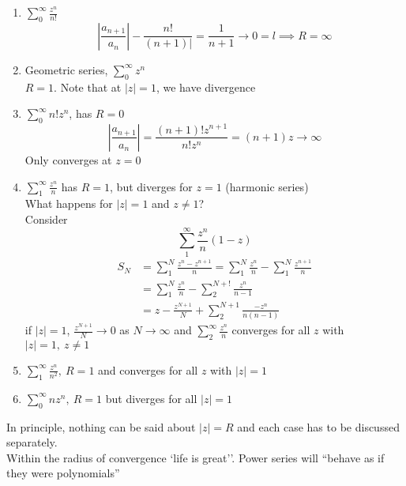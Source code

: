 \begin{example}
\hfill{ }
\begin{enumerate}
    \item $\sum_0^\infty \frac{z^n}{n!}$
    \[\left| \frac{a_{n+1}}{a_n}\right| - \frac{n!}{(n+1)|} = \frac{1}{n+1}\to 0 = l\implies R = \infty\]
    \item Geometric series, $\sum_0^\infty z^n$\\
    $R = 1$. Note that at $|z|=1$, we have divergence\\
    \item $\sum_0^\infty n!z^n$, has $R = 0$
    \[\left|\frac{a_{n+1}}{a_n}\right| = \frac{(n+1)!z^{n+1}}{n!z^n} = (n+1)z \to \infty\]
    Only converges at $z=0$
    \item $\sum_1^\infty \frac{z^n}{n}$ has $R =1$, but diverges for $z=1$ (harmonic series)\\
    What happens for $|z| = 1$ and $z\neq 1$?\\
    Consider
    \[\sum_1^\infty\frac{z^n}{n}(1-z)\]
    \begin{align*}
        S_N &= \sum_1^N\frac{z^n - z^{n+1}}{n} = \sum_1^N \frac{z^n}{n} - \sum_1^N\frac{z^{n+1}}{n}\\
        &=\sum_1^N\frac{z^n}{n} - \sum_2^{N+!}\frac{z^n}{n-1}\\
        &= z- \frac{z^{N+1}}{N} + \sum_2^{N+1}\frac{-z^n}{n(n-1)}
    \end{align*}
    if $|z| = 1$, $\frac{z^{N+1}}{N}\to 0$ as $N\to \infty$ and $\sum_2^\infty \frac{z^n}{n}$ converges for all $z$ with $|z| = 1, \ z\neq 1$
    \item $\sum_1^\infty \frac{z^n}{n^2}, \ R= 1$ and converges for all $z$ with $|z| = 1$
    \item $\sum_0^\infty nz^n, \ R=1$ but diverges for all $|z| = 1$
\end{enumerate}
\begin{remark}
In principle, nothing can be said about $|z| = R$ and each case has to be discussed separately.\\
Within the radius of convergence `life is great''. Power series will ``behave as if they were polynomials''
\end{remark}
\end{example}
